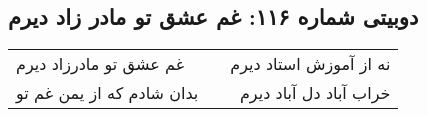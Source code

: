 \begin{center}
\section*{دوبیتی شماره ۱۱۶: غم عشق تو مادر زاد دیرم}
\label{sec:116}
\begin{longtable}{l p{0.5cm} r}
غم عشق تو مادرزاد دیرم
&&
نه از آموزش استاد دیرم
\\
بدان شادم که از یمن غم تو
&&
خراب آباد دل آباد دیرم
\\
\end{longtable}
\end{center}
